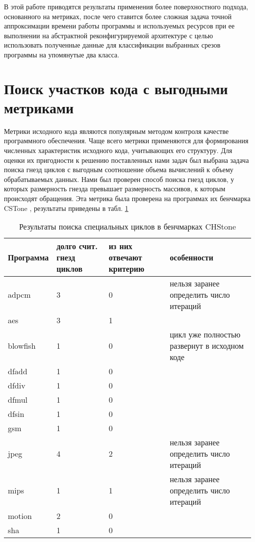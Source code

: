 \documentclass[utf8]{psta}%
\begin{document}
В этой работе приводятся результаты применения более поверхностного подхода, основанного на метриках, после чего ставится более сложная задача точной аппроксимации времени работы программы и используемых ресурсов при ее выполнении на абстрактной реконфигурируемой архитектуре с целью использовать полученные данные для классификации выбранных срезов программы на упомянутые два класса.

\section{Поиск участков кода с выгодными метриками}

Метрики исходного кода являются популярным методом контроля качестве программного обеспечения. Чаще всего метрики применяются для формирования численных характеристик исходного кода, учитывающих его структуру. Для оценки их пригодности к решению поставленных нами задач был выбрана задача поиска гнезд циклов с выгодным соотношение объема вычислений к объему обрабатываемых данных.
Нами был проверен способ поиска гнезд циклов, у которых размерность гнезда превышает размерность массивов, к которым происходят обращения. Эта метрика была проверена на программах их бенчмарка CSTone \cite{Hara2009}, результаты приведены в табл. \ref{table:CHStoneSingularLoops}

\begin{table}
    \begin{tabular}{ | p{1.5cm} | p{2cm} | p{1cm} | p{6cm} |}
    \hline
    Программа & долго счит. гнезд циклов & из них отвечают критерию & особенности \\ \hline
    adpcm & 3 & 0 & нельзя заранее определить число итераций \\ \hline
    aes & 3 & 1 &  \\ \hline
    blowfish & 1 & 0 & цикл уже полностью развернут в исходном коде \\ \hline
    dfadd & 1 & 0 &  \\ \hline
    dfdiv & 1 & 0 &  \\ \hline
    dfmul & 1 & 0 &  \\ \hline
    dfsin & 1 & 0 &  \\ \hline
    gsm & 1 & 0 &  \\ \hline
    jpeg & 4 & 2 & нельзя заранее определить число итераций \\ \hline
    mips & 1 & 1 & нельзя заранее определить число итераций \\ \hline
    motion & 2 & 0 &  \\ \hline
    sha & 1 & 0 &  \\ \hline
    \end{tabular} 
    \caption{Результаты поиска специальных циклов в бенчмарках CHStone}
    \label{table:CHStoneSingularLoops}
\end{table}
\end{document}
